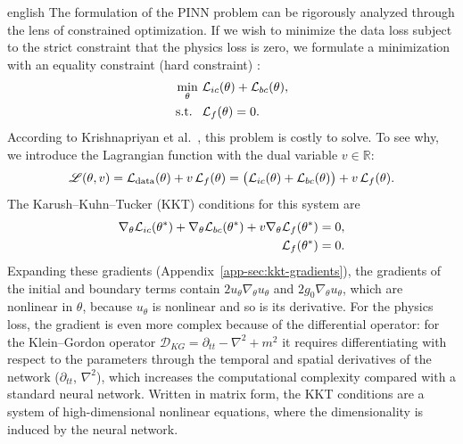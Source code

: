 \documentclass[0000.tex]{subfiles}
\begin{document}
\begin{hyphenrules}{english}
The formulation of the PINN problem can be rigorously analyzed through the lens of constrained
optimization. If we wish to minimize the data loss subject to the strict constraint that the physics
loss is zero, we formulate a minimization with an equality constraint (hard constraint)
\cite{krishnapriyan2021}:
\begin{align}
  \min_{\theta}\ &\mathcal{L}_{ic}(\theta)+\mathcal{L}_{bc}(\theta), \label{eq:hard-obj}\\
  \text{s.t. }\ &\mathcal{L}_f(\theta)=0. \label{eq:hard-constraint}
\end{align}
According to Krishnapriyan et al.~\cite{krishnapriyan2021}, this problem is costly to solve. To see why, we introduce the
Lagrangian function with the dual variable $v\in\mathbb{R}$:
\begin{equation}
  \mathscr{L}(\theta,v)=\mathcal{L}_{\mathrm{data}}(\theta)+v\,\mathcal{L}_f(\theta)
  =\big(\mathcal{L}_{ic}(\theta)+\mathcal{L}_{bc}(\theta)\big)+v\,\mathcal{L}_f(\theta).
  \label{eq:lagrangian}
\end{equation}
The Karush--Kuhn--Tucker (KKT) conditions for this system are \cite{boyd2004}
\begin{align}
  \nabla_\theta\mathcal{L}_{ic}(\theta^{*})+\nabla_\theta\mathcal{L}_{bc}(\theta^{*})+v\nabla_\theta\mathcal{L}_f(\theta^{*})&=0, \label{eq:kkt-1}\\
  \mathcal{L}_f(\theta^{*})&=0. \label{eq:kkt-2}
\end{align}
Expanding these gradients (Appendix~\ref{app-sec:kkt-gradients}), the gradients of the initial and boundary
terms contain $2u_\theta\nabla_\theta u_\theta$ and $2g_0\nabla_\theta u_\theta$, which are nonlinear in
$\theta$, because $u_\theta$ is nonlinear and so is its derivative. For the physics loss, the gradient is
even more complex because of the differential operator: for the Klein--Gordon operator
$\mathcal{D}_{KG}=\partial_{tt}-\nabla^2+m^2$ it requires differentiating with respect to the parameters
through the temporal and spatial derivatives of the network ($\partial_{tt}$, $\nabla^2$), which increases
the computational complexity compared with a standard neural network. Written in matrix form, the KKT
conditions are a system of high-dimensional nonlinear equations, where the dimensionality is induced by
the neural network.


\end{hyphenrules}
\end{document}
